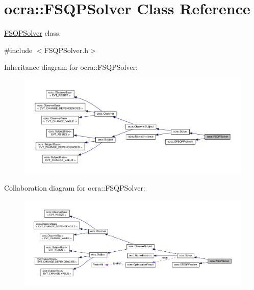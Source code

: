 \hypertarget{classocra_1_1FSQPSolver}{}\section{ocra\+:\+:F\+S\+Q\+P\+Solver Class Reference}
\label{classocra_1_1FSQPSolver}


\hyperlink{classocra_1_1FSQPSolver}{F\+S\+Q\+P\+Solver} class.  




{\ttfamily \#include $<$F\+S\+Q\+P\+Solver.\+h$>$}



Inheritance diagram for ocra\+:\+:F\+S\+Q\+P\+Solver\+:
\nopagebreak
\begin{figure}[H]
\begin{center}
\leavevmode
\includegraphics[width=350pt]{d6/d20/classocra_1_1FSQPSolver__inherit__graph}
\end{center}
\end{figure}


Collaboration diagram for ocra\+:\+:F\+S\+Q\+P\+Solver\+:
\nopagebreak
\begin{figure}[H]
\begin{center}
\leavevmode
\includegraphics[width=350pt]{dd/df0/classocra_1_1FSQPSolver__coll__graph}
\end{center}
\end{figure}
